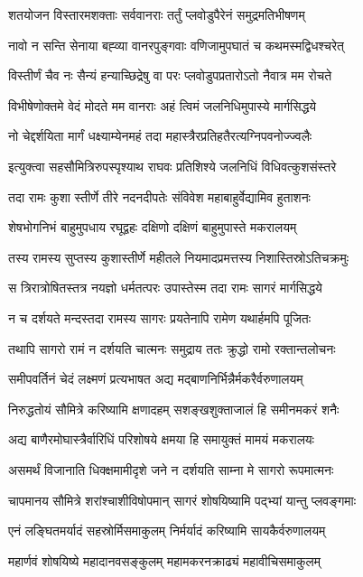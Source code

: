 \twolineshloka
{शतयोजन विस्तारमशक्ताः सर्ववानराः}
{तर्तुं प्लवोडुपैरेनं समुद्रमतिभीषणम्}%

\twolineshloka
{नावो न सन्ति सेनाया बह्व्या वानरपुङ्गवाः}
{वणिजामुपघातं च कथमस्मद्विधश्चरेत्}%

\twolineshloka
{विस्तीर्णं चैव नः सैन्यं हन्याच्छिद्रेषु वा परः}
{प्लवोडुपप्रतारोऽतो नैवात्र मम रोचते}%

\twolineshloka
{विभीषेणोक्तमे वेदं मोदते मम वानराः}
{अहं त्विमं जलनिधिमुपास्ये मार्गसिद्धये}%

\twolineshloka
{नो चेद्दर्शयिता मार्गं धक्ष्याम्येनमहं तदा}
{महास्त्रैरप्रतिहतैरत्यग्निपवनोज्ज्वलैः}%

\twolineshloka
{इत्युक्त्वा सहसौमित्रिरुपस्पृश्याथ राघवः}
{प्रतिशिश्ये जलनिधिं विधिवत्कुशसंस्तरे}%

\twolineshloka
{तदा रामः कुशा स्तीर्णे तीरे नदनदीपतेः}
{संविवेश महाबाहुर्वेद्यामिव हुताशनः}%

\twolineshloka
{शेषभोगनिभं बाहुमुपधाय रघूद्वहः}
{दक्षिणो दक्षिणं बाहुमुपास्ते मकरालयम्}%

\twolineshloka
{तस्य रामस्य सुप्तस्य कुशास्तीर्णे महीतले}
{नियमादप्रमत्तस्य निशास्तिस्रोऽतिचक्रमुः}%

\twolineshloka
{स त्रिरात्रोषितस्तत्र नयज्ञो धर्मतत्परः}
{उपास्तेस्म तदा रामः सागरं मार्गसिद्धये}%

\twolineshloka
{न च दर्शयते मन्दस्तदा रामस्य सागरः}
{प्रयतेनापि रामेण यथार्हमपि पूजितः}%

\twolineshloka
{तथापि सागरो रामं न दर्शयति चात्मनः}
{समुद्राय ततः क्रुद्धो रामो रक्तान्तलोचनः}%

\twolineshloka
{समीपवर्तिनं चेदं लक्ष्मणं प्रत्यभाषत}
{अद्य मद्बाणनिर्भिन्नैर्मकरैर्वरुणालयम्}%

\twolineshloka
{निरुद्धतोयं सौमित्रे करिष्यामि क्षणादहम्}
{सशङ्खशुक्ताजालं हि समीनमकरं शनैः}%

\twolineshloka
{अद्य बाणैरमोघास्त्रैर्वारिधिं परिशोषये}
{क्षमया हि समायुक्तं मामयं मकरालयः}%

\twolineshloka
{असमर्थं विजानाति धिक्क्षमामीदृशे जने}
{न दर्शयति साम्ना मे सागरो रूपमात्मनः}%

\twolineshloka
{चापमानय सौमित्रे शरांश्चाशीविषोपमान्}
{सागरं शोषयिष्यामि पद्भ्यां यान्तु प्लवङ्गमाः}%

\twolineshloka
{एनं लङ्घितमर्यादं सहस्रोर्मिसमाकुलम्}
{निर्मर्यादं करिष्यामि सायकैर्वरुणालयम्}%

\twolineshloka
{महार्णवं शोषयिष्ये महादानवसङ्कुलम्}
{महामकरनक्राढ्यं महावीचिसमाकुलम्}%

